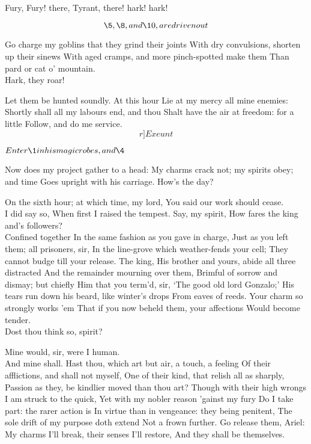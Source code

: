 \documentclass[11pt]{book}
\begin{document}
\1	Fury, Fury! there, Tyrant, there! hark! hark!

	\[\5, \8, and \10, are driven out\]

	Go charge my goblins that they grind their joints
	With dry convulsions, shorten up their sinews
	With aged cramps, and more pinch-spotted make them
	Than pard or cat o' mountain. \\

\4	Hark, they roar!

\1	Let them be hunted soundly. At this hour
	Lie at my mercy all mine enemies:
	Shortly shall all my labours end, and thou
	Shalt have the air at freedom: for a little
	Follow, and do me service. \[r]Exeunt\]

\Act 
{}

	\(Enter \1 in his magic robes, and \4\)

\1	Now does my project gather to a head:
	My charms crack not; my spirits obey; and time
	Goes upright with his carriage. How's the day?

\4	On the sixth hour; at which time, my lord,
	You said our work should cease. \\

\1	I did say so,
	When first I raised the tempest. Say, my spirit,
	How fares the king and's followers? \\

\4	Confined together
	In the same fashion as you gave in charge,
	Just as you left them; all prisoners, sir,
	In the line-grove which weather-fends your cell;
	They cannot budge till your release. The king,
	His brother and yours, abide all three distracted
	And the remainder mourning over them,
	Brimful of sorrow and dismay; but chiefly
	Him that you term'd, sir, `The good old lord Gonzalo;'
	His tears run down his beard, like winter's drops
	From eaves of reeds. Your charm so strongly works 'em
	That if you now beheld them, your affections
	Would become tender. \\

\1	Dost thou think so, spirit?

\4	Mine would, sir, were I human. \\

\1	And mine shall.
	Hast thou, which art but air, a touch, a feeling
	Of their afflictions, and shall not myself,
	One of their kind, that relish all as sharply,
	Passion as they, be kindlier moved than thou art?
	Though with their high wrongs I am struck to the quick,
	Yet with my nobler reason 'gainst my fury
	Do I take part: the rarer action is
	In virtue than in vengeance: they being penitent,
	The sole drift of my purpose doth extend
	Not a frown further. Go release them, Ariel:
	My charms I'll break, their senses I'll restore,
	And they shall be themselves. \\
\end{document}
